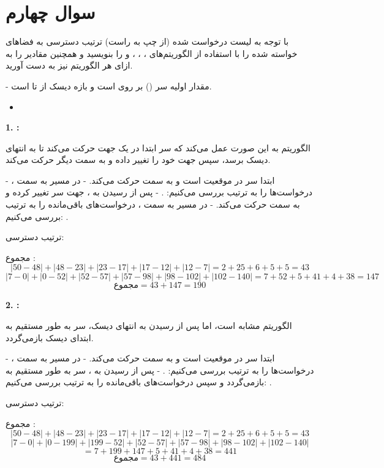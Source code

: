 \section{سوال چهارم}


با توجه به لیست درخواست شده (از چپ به راست) ترتیب دسترسی به فضاهای خواسته شده را با استفاده از الگوریتم‌های ، ، ،  و  را بنویسید و همچنین مقادیر  را به ازای هر الگوریتم نیز به دست آورید.

- مقدار اولیه سر () بر روی  است و بازه دیسک از  تا  است.


\begin{latin}
	\begin{itemize}
		\item {}
	\end{itemize}
\end{latin}


\begin{qsolve}
	\textbf{1. :}
	
	الگوریتم  به این صورت عمل می‌کند که سر ابتدا در یک جهت حرکت می‌کند تا به انتهای دیسک برسد، سپس جهت خود را تغییر داده و به سمت دیگر حرکت می‌کند.
	
	- ابتدا سر در موقعیت  است و به سمت  حرکت می‌کند.
	- در مسیر به سمت ، درخواست‌ها را به ترتیب بررسی می‌کنیم: .
	- پس از رسیدن به ، جهت سر تغییر کرده و به سمت  حرکت می‌کند.
	- در مسیر به سمت ، درخواست‌های باقی‌مانده را به ترتیب بررسی می‌کنیم: .
	
	ترتیب دسترسی: 
	
	
	
	
	مجموع :
	\[
	|50 - 48| + |48 - 23| + |23 - 17| + |17 - 12| + |12 - 7| = 2 + 25 + 6 + 5 + 5 = 43
	\]
	\[
	|7 - 0| + |0 - 52| + |52 - 57| + |57 - 98| + |98 - 102| + |102 - 140| = 7 + 52 + 5 + 41 + 4 + 38 = 147
	\]
	\[
	\text{مجموع} = 43 + 147 = 190
	\]
	
	\textbf{2. :}
	
	الگوریتم  مشابه  است، اما پس از رسیدن به انتهای دیسک، سر به طور مستقیم به ابتدای دیسک بازمی‌گردد.
	
	- ابتدا سر در موقعیت  است و به سمت  حرکت می‌کند.
	- در مسیر به سمت ، درخواست‌ها را به ترتیب بررسی می‌کنیم: .
	- پس از رسیدن به ، سر به طور مستقیم به  بازمی‌گردد و سپس درخواست‌های باقی‌مانده را به ترتیب بررسی می‌کنیم: .
	
	ترتیب دسترسی: 
	


مجموع :
	\[
	|50 - 48| + |48 - 23| + |23 - 17| + |17 - 12| + |12 - 7| = 2 + 25 + 6 + 5 + 5 = 43
	\]
	\[
	|7 - 0| + |0 - 199| + |199 - 52| + |52 - 57| + |57 - 98| + |98 - 102| + |102 - 140| 
	\]
	\[
	= 7 + 199 + 147 + 5 + 41 + 4 + 38 = 441
	\]
	\[
	\text{مجموع} = 43 + 441 = 484
	\]
\end{qsolve}
\newpage

